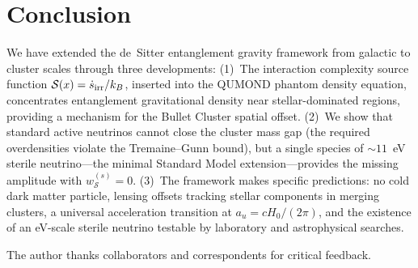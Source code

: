 \documentclass[aps,prd,twocolumn,superscriptaddress,nofootinbib]{revtex4-2}
\newcommand{\au}{a_u}
\newcommand{\wS}{w_{\mathcal{S}}}
\newcommand{\Ssrc}{\mathcal{S}}
\begin{document}
\section{Conclusion}
\label{sec:conclusion}

We have extended the de~Sitter entanglement gravity framework from galactic to cluster scales through three developments:
(1)~The interaction complexity source function $\Ssrc(x)=\dot{s}_{\rm irr}/k_B$, inserted into the QUMOND phantom density equation, concentrates entanglement gravitational density near stellar-dominated regions, providing a mechanism for the Bullet Cluster spatial offset.
(2)~We show that standard active neutrinos cannot close the cluster mass gap (the required overdensities violate the Tremaine--Gunn bound), but a single species of $\sim 11$~eV sterile neutrino---the minimal Standard Model extension---provides the missing amplitude with $\wS^{(s)}=0$.
(3)~The framework makes specific predictions: no cold dark matter particle, lensing offsets tracking stellar components in merging clusters, a universal acceleration transition at $\au=cH_0/(2\pi)$, and the existence of an eV-scale sterile neutrino testable by laboratory and astrophysical searches.

\begin{acknowledgments}
The author thanks collaborators and correspondents for critical feedback.
\end{acknowledgments}
\end{document}
